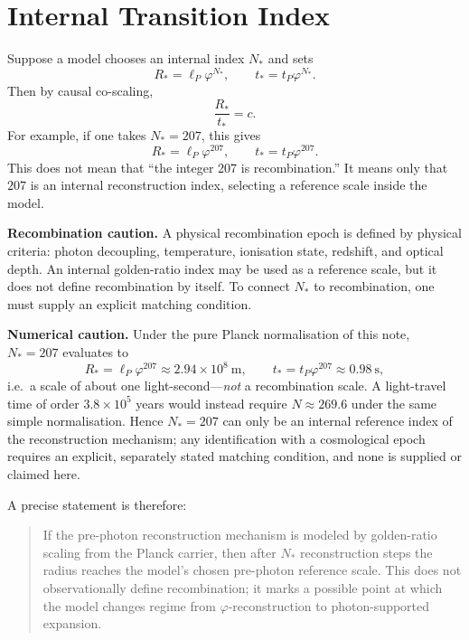 \documentclass[11pt,a4paper]{article}
\newcommand{\lP}{\ell_{P}}
\newcommand{\tP}{t_{P}}
\newcommand{\ph}{\varphi}
\newcommand{\Rstar}{R_{\ast}}
\newcommand{\tstar}{t_{\ast}}
\begin{document}
\section{Internal Transition Index}

Suppose a model chooses an internal index $N_\ast$ and sets
\[
  \Rstar=\lP\ph^{N_\ast},
  \qquad
  \tstar=\tP\ph^{N_\ast}.
\]
Then by causal co-scaling,
\[
  \frac{\Rstar}{\tstar}=c.
\]
For example, if one takes $N_\ast=207$, this gives
\[
  \Rstar=\lP\ph^{207},
  \qquad
  \tstar=\tP\ph^{207}.
\]
This does not mean that ``the integer 207 is recombination.''  It means only that
$207$ is an internal reconstruction index, selecting a reference scale inside the
model.

\begin{cautionBox}
\textbf{Recombination caution.}
A physical recombination epoch is defined by physical criteria: photon decoupling,
temperature, ionisation state, redshift, and optical depth.  An internal golden-ratio
index may be used as a reference scale, but it does not define recombination by
itself.  To connect $N_\ast$ to recombination, one must supply an explicit matching
condition.
\end{cautionBox}

\begin{cautionBox}
\textbf{Numerical caution.}
Under the pure Planck normalisation of this note, $N_\ast=207$ evaluates to
\[
  \Rstar=\lP\ph^{207}\approx 2.94\times10^{8}\ \mathrm{m},
  \qquad
  \tstar=\tP\ph^{207}\approx 0.98\ \mathrm{s},
\]
i.e.\ a scale of about one light-second---\emph{not} a recombination scale.  A
light-travel time of order $3.8\times10^{5}$ years would instead require
$N\approx269.6$ under the same simple normalisation.  Hence $N_\ast=207$ can only be
an internal reference index of the reconstruction mechanism; any identification with
a cosmological epoch requires an explicit, separately stated matching condition, and
none is supplied or claimed here.
\end{cautionBox}

A precise statement is therefore:
\begin{quote}
If the pre-photon reconstruction mechanism is modeled by golden-ratio scaling from
the Planck carrier, then after $N_\ast$ reconstruction steps the radius reaches the
model's chosen pre-photon reference scale.  This does not observationally define
recombination; it marks a possible point at which the model changes regime from
$\ph$-reconstruction to photon-supported expansion.
\end{quote}
\end{document}
